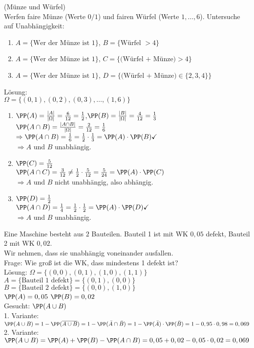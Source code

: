  (Münze und Würfel)\\
Werfen faire Münze (Werte $0/1$) und fairen Würfel (Werte $1,\dots,6$). Untersuche auf Unabhängigkeit:
\begin{enumerate}
\item $A=\{\text{Wer der Münze ist }1\}$, $B=\{\text{Würfel }>4\}$
\item $A=\{\text{Wer der Münze ist }1\}$, $C=\{\text{(Würfel + Münze)} >4 \}$
\item $A=\{\text{Wer der Münze ist }1\}$, $D=\{\text{(Würfel + Münze)}\in\{2,3,4\}\}$
\end{enumerate}
Lösung:\\
$\Omega = \{ (0,1), (0,2), (0,3),\dots , (1,6)\}$
\begin{enumerate}
\item $\PP(A) =\frac{|A|}{|\Omega|}=\frac{6}{12}=\frac{1}{2}$,\quad $\PP(B) = \frac{|B|}{|\Omega|}=\frac{4}{12}=\frac{1}{3}$\\
$\PP(A \cap B)=\frac{|A\cap B|}{|\Omega|}=\frac{2}{12}=\frac{1}{6}$\\
$\Rightarrow \PP(A\cap B) = \frac{1}{6}=\frac{1}{2}\cdot \frac{1}{3}= \PP(A)\cdot \PP(B) \checkmark$\\
$\Rightarrow A$ und $B$ unabhängig.
\item $\PP(C) = \frac{5}{12}$\\
$\PP(A \cap C) = \frac{3}{12} \not = \frac{1}{2}\cdot \frac{5}{12} = \frac{5}{24} = \PP(A) \cdot \PP(C)$\\
$\Rightarrow A$ und $B$ nicht unabhängig, also abhängig.
\item $\PP(D)=\frac{1}{2}$\\
$\PP(A \cap D ) = \frac{1}{4} = \frac{1}{2} \cdot \frac{1}{2} = \PP(A) \cdot \PP(D) \checkmark$\\
$\Rightarrow A$ und $B$ unabhängig.
\end{enumerate}

 Eine Maschine besteht aus $2$ Bauteilen. Bauteil 1 ist mit WK $0,05$ defekt, Bauteil 2 mit WK $0,02$.\\
Wir nehmen, dass sie unabhängig voneinander ausfallen.\\
Frage: Wie groß ist die WK, dass mindestens 1 defekt ist?\\
Lösung: $\Omega = \{(0,0), (0,1), (1,0), (1,1)\}$\\
$A=\{\text{Bauteil 1 defekt}\}=\{(0,1),(0,0)\}$\\
$B=\{\text{Bauteil 2 defekt}\}=\{(0,0), (1,0)\}$\\
$\PP(A) = 0,05$ \quad $\PP(B) = 0,02$\\
Gesucht: $\PP(A \cup B)$\\
1. Variante: $\PP(A \cup B) = 1 - \PP(\overline{A \cup B}) = 1 - \PP(\bar A \cap \bar B) = 1 - \PP(\bar A) \cdot \PP(\bar B) = 1-0,95\cdot 0,98 = 0,069$\\
2. Variante: $\PP(A \cup B) = \PP(A) + \PP(B) - \PP(A \cap B) = 0,05 + 0,02 - 0,05\cdot 0,02 = 0,069$

